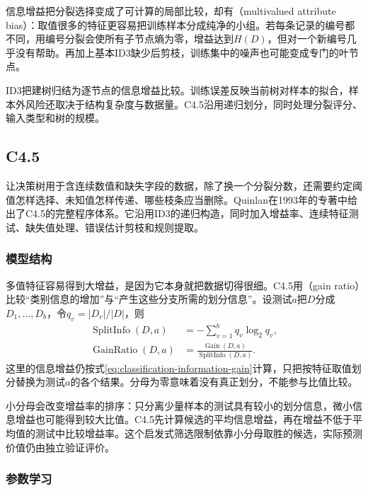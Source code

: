 信息增益把分裂选择变成了可计算的局部比较，却有（multivalued attribute bias）：取值很多的特征更容易把训练样本分成纯净的小组。若每条记录的编号都不同，用编号分裂会使所有子节点熵为零，增益达到$H(D)$，但对一个新编号几乎没有帮助。再加上基本ID3缺少后剪枝，训练集中的噪声也可能变成专门的叶节点。

ID3把建树归结为逐节点的信息增益比较。训练误差反映当前树对样本的拟合，样本外风险还取决于结构复杂度与数据量。C4.5沿用递归划分，同时处理分裂评分、输入类型和树的规模。

\subsection{C4.5}
\label{sec:classification-c45}

让决策树用于含连续数值和缺失字段的数据，除了换一个分裂分数，还需要约定阈值怎样选择、未知值怎样传递、哪些枝条应当删除。Quinlan在1993年的专著中给出了C4.5的完整程序体系。它沿用ID3的递归构造，同时加入增益率、连续特征测试、缺失值处理、错误估计剪枝和规则提取。

\subsubsection{模型结构}
\label{sec:classification-c45-structure}

多值特征容易得到大增益，是因为它本身就把数据切得很细。C4.5用（gain ratio）比较“类别信息的增加”与“产生这些分支所需的划分信息”。设测试$a$把$D$分成$D_1,\ldots,D_b$，令$q_v=|D_v|/|D|$，则
\begin{align}
  \operatorname{SplitInfo}(D,a)
  &=-\sum_{v=1}^{b}q_v\log_2 q_v,
  \label{eq:classification-split-information}\\
  \operatorname{GainRatio}(D,a)
  &=\frac{\operatorname{Gain}(D,a)}
  {\operatorname{SplitInfo}(D,a)}.
  \label{eq:classification-gain-ratio}
\end{align}
这里的信息增益仍按式\eqref{eq:classification-information-gain}计算，只把按特征取值划分替换为测试$a$的各个结果。分母为零意味着没有真正划分，不能参与比值比较。

小分母会改变增益率的排序：只分离少量样本的测试具有较小的划分信息，微小信息增益也可能得到较大比值。C4.5先计算候选的平均信息增益，再在增益不低于平均值的测试中比较增益率。这个启发式筛选限制依靠小分母取胜的候选，实际预测价值仍由独立验证评价。

\subsubsection{参数学习}
\label{sec:classification-c45-learning}

